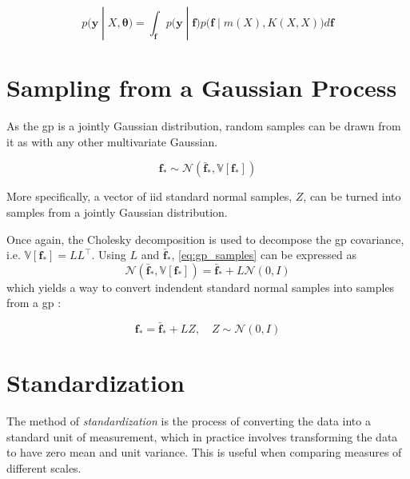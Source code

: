 \begin{equation}
    p(\boldsymbol{y} \; | \; X, \boldsymbol{\theta}) = \int_{\boldsymbol{f}} p\big(\boldsymbol{y} \;| \; \boldsymbol{f}\big) p\big(\boldsymbol{f} \; |\; m(X), K(X, X)\big) d\boldsymbol{f}
\end{equation}

\section{Sampling from a Gaussian Process}\label{sec:gp_samples}
As the \acrshort{gp} is a jointly Gaussian distribution, random samples can be drawn from it as with any other multivariate Gaussian.

\begin{equation}\label{eq:gp_samples}
    \boldsymbol{f}_* \sim \mathcal{N}(\bar{\boldsymbol{f}}_*, \mathbb{V}[\boldsymbol{f}_*])
\end{equation}

More specifically, a vector of \acrshort{iid} standard normal samples, $Z$, can be turned into samples from a jointly Gaussian distribution.

Once again, the Cholesky decomposition is used to decompose the \acrshort{gp} covariance, i.e. $\mathbb{V}[\boldsymbol{f}_*] = L L^\intercal$. Using $L$ and $\bar{\boldsymbol{f}}_*$, \cref{eq:gp_samples} can be expressed as 
\begin{equation}
    \mathcal{N}(\bar{\boldsymbol{f}}_*, \mathbb{V}[\boldsymbol{f}_*]) = \bar{\boldsymbol{f}}_* + L \mathcal{N}(0, I)
\end{equation}
which yields a way to convert indendent standard normal samples into samples from a \acrshort{gp} \cite{rasmussen}:

\begin{equation}
    \boldsymbol{f}_* = \bar{\boldsymbol{f}}_* + L Z, \quad Z \sim \mathcal{N}(0, I)
\end{equation}

\section{Standardization}
The method of \textit{standardization} is the process of converting the data into a standard unit of measurement, which in practice involves transforming the data to have zero mean and unit variance. This is useful when comparing measures of different scales.

